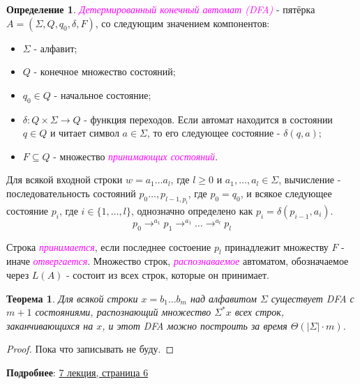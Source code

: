 \documentclass[a4paper]{article}
\theoremstyle{indented}
\newtheorem{theorem}{Теорема}
\theoremstyle{definition}
\newtheorem{defn}{Определение}
\theoremstyle{remark}
\begin{document}
\begin{defn}
    \textcolor{magenta}{\hypertarget{d20}{\textit{Детермированный конечный автомат (DFA)}}} - пятёрка $A=(\Sigma, Q, q_0, \delta, F)$, со следующим значением компонентов:
    
    \begin{itemize}
        \item $\Sigma$ - алфавит; 
        \item $Q$ - конечное множество состояний; 
        \item $q_0\in Q$ - начальное состояние; 
        \item $\delta:Q\times \Sigma \rightarrow Q$ - функция переходов. Если автомат находится в состоянии $q\in Q$ и читает символ $a\in \Sigma$, то его следующее состояние - $\delta(q, a)$; 
        \item $F\subseteq Q$ - множество \textcolor{magenta}{\hypertarget{d21}{\textit{принимающих состояний}}}.
    \end{itemize}

    Для всякой входной строки $w=a_1\ldots a_l$, где $l\geq 0$ и $a_1, \ldots, a_l\in \Sigma$, вычисление - последовательность состояний $p_0 \ldots, p_{l-1, p_l}$, где $p_0=q_0$, и всякое следующее состояние $p_i$, где $i\in\{1, \ldots, l\}$, однозначно определено как $p_i=\delta(p_{i-1}, a_i)$. 
    \[
        p_0\rightarrow^{a_1}p_1\rightarrow^{a_1}\ldots \rightarrow^{a_l} p_l
    \]

    Строка \textcolor{magenta}{\hypertarget{d22}{\textit{принимается}}}, если последнее состоение $p_l$ принадлежит множеству $F$ - иначе \textcolor{magenta}{\hypertarget{d23}{\textit{отвергается}}}. Множество строк, \textcolor{magenta}{\hypertarget{d24}{\textit{распознаваемое}}} автоматом, обозначаемое через $L(A)$ - состоит из всех строк, которые он принимает.
\end{defn}

\begin{theorem}
    Для всякой строки $x=b_1\ldots b_m$ над алфавитом $\Sigma$ существует DFA с $m+1$ состояниями, распознающий множество $\Sigma^* x$ всех строк, заканчивающихся на $x$, и этот DFA можно построить за время $\Theta(|\Sigma|\cdot m)$. 
\end{theorem}

\begin{proof}
    Пока что записывать не буду.
\end{proof}

\textbf{Подробнее}: \href{https://users.math-cs.spbu.ru/~okhotin/teaching/algorithms_2020/okhotin_algorithms_2020_l7.pdf}{7 лекция, страница 6}
\end{document}
